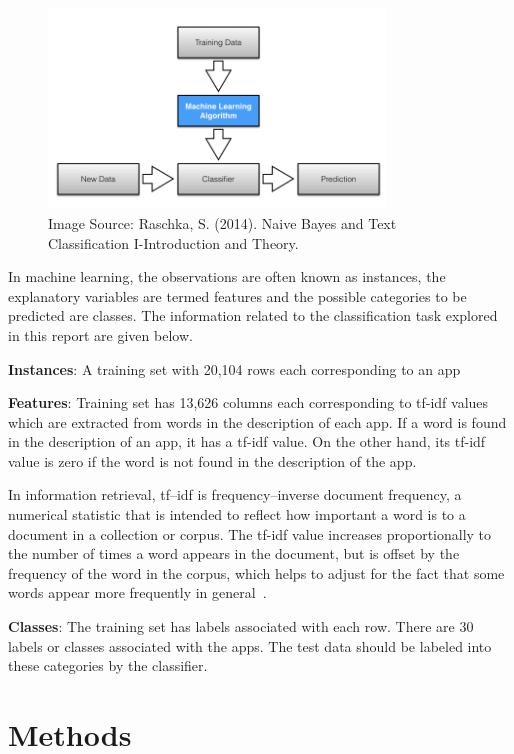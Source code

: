 \documentclass[letterpaper,10pt]{article}
\theoremstyle{mytheor}
\begin{document}
\begin{figure}[H]
\includegraphics[width=0.8\textwidth]{learning_algorithm_1}
\centering
\caption{Image Source: Raschka, S. (2014). Naive Bayes and Text Classification I-Introduction and Theory.}
\label{fig:1}
\end{figure}

In machine learning, the observations are often known as instances, the explanatory variables are termed features and the possible categories to be predicted are classes. The information related to the classification task explored in this report are given below.

\textbf{Instances}: A training set with 20,104 rows each corresponding to an app

\textbf{Features}: Training set has 13,626 columns each corresponding to tf-idf values which are extracted from words in the description of each app. If a word is found in the description of an app, it has a tf-idf value. On the other hand, its tf-idf value is zero if the word is not found in the description of the app.

In information retrieval, tf–idf is frequency–inverse document frequency,  a numerical statistic that is intended to reflect how important a word is to a document in a collection or corpus. The tf-idf value increases proportionally to the number of times a word appears in the document, but is offset by the frequency of the word in the corpus, which helps to adjust for the fact that some words appear more frequently in general~\cite{wiki:tfidf}.

\textbf{Classes}: The training set has labels associated with each row. There are 30 labels or classes associated with the apps. The test data should be labeled into these categories by the classifier.  

\section{Methods}
\end{document}
